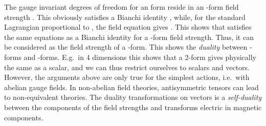 \documentclass[a4paper,11pt,twoside]{article}
\def\rmd{{\rm d}}
\begin{document}
The gauge invariant degrees of freedom for an \coordHE{} form reside in an
\coordHE{}-form field strength \myHighlight{$F^{(n+1)}=\rmd A^{(n)}$}\coordHE{}. This obviously
satisfies a Bianchi identity \myHighlight{$\rmd F^{(n+1)}=0$}\coordHE{}, while, for the standard
Lagrangian proportional to \coordHE{},  the field equation gives \myHighlight{$\rmd {}^*F=0$}\coordHE{}. This shows that
\coordHE{} satisfies the same equations as a Bianchi identity for a
\coordHE{}-form field strength. Thus, it can be considered as the field
strength of a \coordHE{}-form. This shows the \emph{duality} between
\coordHE{}-forms and \coordHE{}-forms. E.g.\ in 4 dimensions this shows that a
2-form gives physically the same as a scalar, and we can thus restrict
ourselves to scalars and vectors. However, the arguments above are only
true for the simplest actions, i.e.\ with abelian gauge fields. In
non-abelian field theories, antisymmetric tensors can lead to
non-equivalent theories. The duality transformations on vectors is a
\emph{self-duality} between the components of the field strengths \coordHE{} and transforms electric in magnetic components.
\end{document}
